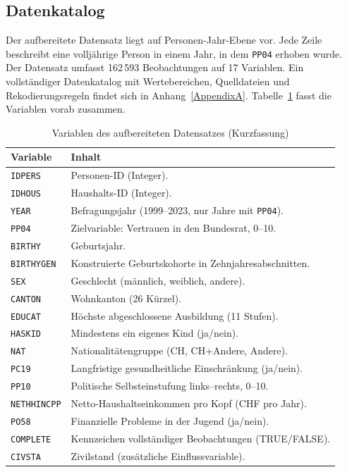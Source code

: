 \subsection{Datenkatalog}
\label{subsec:datenkatalog}

Der aufbereitete Datensatz liegt auf Personen-Jahr-Ebene vor. Jede Zeile beschreibt
eine volljährige Person in einem Jahr, in dem \texttt{PP04} erhoben wurde. Der
Datensatz umfasst 162\,593 Beobachtungen auf 17 Variablen. Ein vollständiger
Datenkatalog mit Wertebereichen, Quelldateien und Rekodierungsregeln findet sich in
Anhang~\ref{AppendixA}. Tabelle~\ref{tab:datenkatalog-kurz} fasst die Variablen
vorab zusammen.

\begin{table}[h]
\centering
\caption{Variablen des aufbereiteten Datensatzes (Kurzfassung)}
\label{tab:datenkatalog-kurz}
\begin{tabularx}{\textwidth}{lX}
\toprule
Variable & Inhalt \\
\midrule
\texttt{IDPERS}     & Personen-ID (Integer). \\
\texttt{IDHOUS}     & Haushalts-ID (Integer). \\
\texttt{YEAR}       & Befragungsjahr (1999--2023, nur Jahre mit \texttt{PP04}). \\
\texttt{PP04}       & Zielvariable: Vertrauen in den Bundesrat, 0--10. \\
\texttt{BIRTHY}     & Geburtsjahr. \\
\texttt{BIRTHYGEN}  & Konstruierte Geburtskohorte in Zehnjahresabschnitten. \\
\texttt{SEX}        & Geschlecht (männlich, weiblich, andere). \\
\texttt{CANTON}     & Wohnkanton (26 Kürzel). \\
\texttt{EDUCAT}     & Höchste abgeschlossene Ausbildung (11 Stufen). \\
\texttt{HASKID}     & Mindestens ein eigenes Kind (ja/nein). \\
\texttt{NAT}        & Nationalitätengruppe (CH, CH+Andere, Andere). \\
\texttt{PC19}       & Langfristige gesundheitliche Einschränkung (ja/nein). \\
\texttt{PP10}       & Politische Selbsteinstufung links--rechts, 0--10. \\
\texttt{NETHHINCPP} & Netto-Haushaltseinkommen pro Kopf (CHF pro Jahr). \\
\texttt{PO58}       & Finanzielle Probleme in der Jugend (ja/nein). \\
\texttt{COMPLETE}   & Kennzeichen vollständiger Beobachtungen (TRUE/FALSE). \\
\texttt{CIVSTA}     & Zivilstand (zusätzliche Einflussvariable). \\
\bottomrule
\end{tabularx}
\end{table}

